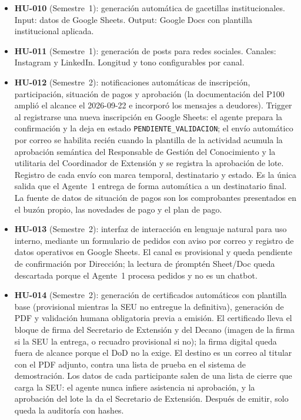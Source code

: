 \documentclass[a4paper, 12pt]{article}
\begin{document}
\begin{itemize}
  \item \textbf{HU-010} (Semestre~1): generaci\'on autom\'atica de gacetillas institucionales. Input: datos de Google Sheets. Output: Google Docs con plantilla institucional aplicada.
  \item \textbf{HU-011} (Semestre~1): generaci\'on de posts para redes sociales. Canales: Instagram y LinkedIn. Longitud y tono configurables por canal.
  \item \textbf{HU-012} (Semestre~2): notificaciones autom\'aticas de inscripci\'on, participaci\'on, situaci\'on de pagos y aprobaci\'on (la documentaci\'on del \ac{P100} ampli\'o el alcance el 2026-09-22 e incorpor\'o los mensajes a deudores). Trigger al registrarse una nueva inscripci\'on en Google Sheets: el agente prepara la confirmaci\'on y la deja en estado \texttt{PENDIENTE\_VALIDACION}; el env\'io autom\'atico por correo se habilita reci\'en cuando la plantilla de la actividad acumula la aprobaci\'on sem\'antica del Responsable de Gesti\'on del Conocimiento y la utilitaria del Coordinador de Extensi\'on y se registra la aprobaci\'on de lote. Registro de cada env\'io con marca temporal, destinatario y estado. Es la \'unica salida que el Agente~1 entrega de forma autom\'atica a un destinatario final. La fuente de datos de situaci\'on de pagos son los comprobantes presentados en el buz\'on propio, las novedades de pago y el plan de pago.
  \item \textbf{HU-013} (Semestre~2): interfaz de interacci\'on en lenguaje natural para uso interno, mediante un formulario de pedidos con aviso por correo y registro de datos operativos en Google Sheets. El canal es provisional y queda pendiente de confirmaci\'on por Direcci\'on; la lectura de \'prompt\' en Sheet/Doc queda descartada porque el Agente~1 procesa pedidos y no es un chatbot.
  \item \textbf{HU-014} (Semestre~2): generaci\'on de certificados autom\'aticos con plantilla base (provisional mientras la \ac{SEU} no entregue la definitiva), generaci\'on de PDF y validaci\'on humana obligatoria previa a emisi\'on. El certificado lleva el bloque de firma del Secretario de Extensi\'on y del Decano (imagen de la firma si la \ac{SEU} la entrega, o recuadro provisional si no); la firma digital queda fuera de alcance porque el \ac{DoD} no la exige. El destino es un correo al titular con el PDF adjunto, contra una lista de prueba en el sistema de demostraci\'on. Los datos de cada participante salen de una lista de cierre que carga la \ac{SEU}: el agente nunca infiere asistencia ni aprobaci\'on, y la aprobaci\'on del lote la da el Secretario de Extensi\'on. Despu\'es de emitir, solo queda la auditor\'ia con hashes.

\end{itemize}
\end{document}
